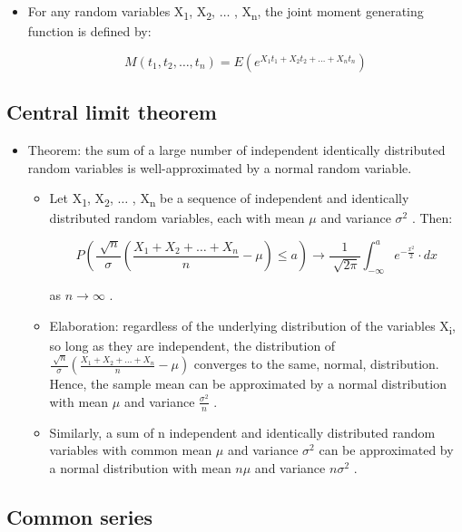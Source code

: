 \documentclass[12pt]{report}
\renewcommand{\_}{\kern-1.5pt\textunderscore\kern-1.5pt}
\begin{document}
\begin{itemize}
	\item For any random variables X\textsubscript{1}, X\textsubscript{2}, $ \ldots $ , X\textsubscript{n}, the joint moment generating function is defined by:\par

 \[ M \left( t_{1},t_{2}, \ldots ,t_{n} \right) =E \left( e^{X_{1}t_{1}+X_{2}t_{2}+ \ldots +X_{n}t_{n}} \right)  \] \par


\end{itemize}\subsection*{Central limit theorem}
\begin{itemize}
	\item Theorem: the sum of a large number of independent identically distributed random variables is well-approximated by a normal random variable.\par

\begin{itemize}
	\item Let X\textsubscript{1}, X\textsubscript{2}, $ \ldots $ , X\textsubscript{n} be a sequence of independent and identically distributed random variables, each with mean  \(  \mu  \)  and variance  \(  \sigma ^{2} \) . Then:\par

 \[ P \left( \frac{\sqrt[]{n}}{ \sigma } \left( \frac{X_{1}+X_{2}+ \ldots +X_{n}}{n}- \mu  \right)  \leq a \right)  \rightarrow \frac{1}{\sqrt[]{2 \pi }} \int _{-\infty}^{a}e^{-\frac{x^{2}}{2}} \cdot dx \] \par

as  \( n \rightarrow \infty \) .\par

	\item Elaboration: regardless of the underlying distribution of the variables X\textsubscript{i}, so long as they are independent, the distribution of  \( \frac{\sqrt[]{n}}{ \sigma } \left( \frac{X_{1}+X_{2}+ \ldots +X_{n}}{n}- \mu  \right)  \)  converges to the same, normal, distribution. Hence, the sample mean can be approximated by a normal distribution with mean  \(  \mu  \)  and variance  \( \frac{ \sigma ^{2}}{n} \) .\par

	\item Similarly, a sum of n independent and identically distributed random variables with common mean  \(  \mu  \)  and variance  \(  \sigma ^{2} \)  can be approximated by a normal distribution with mean  \( n \mu  \)  and variance  \( n \sigma ^{2} \) .\par


\end{itemize}
\end{itemize}\subsection*{Common series}
\end{document}
